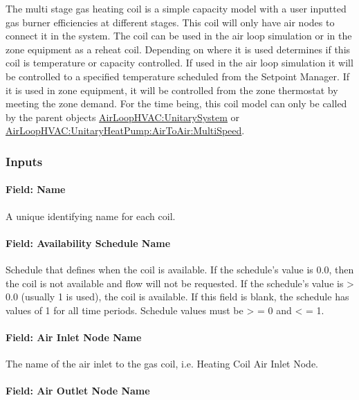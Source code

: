 The multi stage gas heating coil is a simple capacity model with a user inputted gas burner efficiencies at different stages. This coil will only have air nodes to connect it in the system. The coil can be used in the air loop simulation or in the zone equipment as a reheat coil. Depending on where it is used determines if this coil is temperature or capacity controlled. If used in the air loop simulation it will be controlled to a specified temperature scheduled from the Setpoint Manager. If it is used in zone equipment, it will be controlled from the zone thermostat by meeting the zone demand. For the time being, this coil model can only be called by the parent objects \hyperref[airloophvacunitarysystem]{AirLoopHVAC:UnitarySystem} or \hyperref[airloophvacunitaryheatpumpairtoairmultispeed]{AirLoopHVAC:UnitaryHeatPump:AirToAir:MultiSpeed}.

\subsubsection{Inputs}\label{inputs-11-005}

\paragraph{Field: Name}\label{field-name-10-005}

A unique identifying name for each coil.

\paragraph{Field: Availability Schedule Name}\label{field-availability-schedule-name-5-001}

Schedule that defines when the coil is available. If the schedule's value is 0.0, then the coil is not available and flow will not be requested. If the schedule's value is \textgreater{} 0.0 (usually 1 is used), the coil is available. If this field is blank, the schedule has values of 1 for all time periods. Schedule values must be \textgreater{} = 0 and \textless{} = 1.

\paragraph{Field: Air Inlet Node Name}\label{field-air-inlet-node-name-7}

The name of the air inlet to the gas coil, i.e. Heating Coil Air Inlet Node.

\paragraph{Field: Air Outlet Node Name}\label{field-air-outlet-node-name-7-000}

